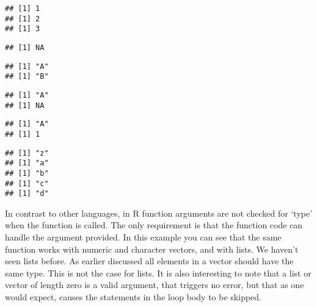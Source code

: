 \documentclass[paper=a4,headsepline,BCOR=12mm,twoside,open=right,%
titlepage,headings=small,fontsize=10pt,index=totoc,bibliography=totoc,%
captions=tableheading,captions=nooneline]{scrbook}\usepackage{knitr}
\begin{document}
\begin{knitrout}\footnotesize
{}\color{fgcolor}\begin{kframe}
\begin{alltt}
 \hlkwb{<-} \hlstd{(}\hlstd{) \{}
     
\hlstd{\}}
\hlstd{(}\hlstd{(}\hlstd{))}
\hlstd{(}\hlopt{:}\hlstd{)}
\end{alltt}
\begin{verbatim}
## [1] 1
## [1] 2
## [1] 3
\end{verbatim}
\begin{alltt}
\hlstd{(}\hlstd{)}
\end{alltt}
\begin{verbatim}
## [1] NA
\end{verbatim}
\begin{alltt}
\hlstd{(}\hlstd{(}\hlstd{,} \hlstd{))}
\end{alltt}
\begin{verbatim}
## [1] "A"
## [1] "B"
\end{verbatim}
\begin{alltt}
\hlstd{(}\hlstd{(}\hlstd{,} \hlstd{))}
\end{alltt}
\begin{verbatim}
## [1] "A"
## [1] NA
\end{verbatim}
\begin{alltt}
\hlstd{(}\hlstd{(}\hlstd{,} \hlstd{))}
\end{alltt}
\begin{verbatim}
## [1] "A"
## [1] 1
\end{verbatim}
\begin{alltt}
\hlstd{(}\hlstd{(}\hlstd{, letters[}\hlopt{:}\hlstd{]))}
\end{alltt}
\begin{verbatim}
## [1] "z"
## [1] "a"
## [1] "b"
## [1] "c"
## [1] "d"
\end{verbatim}
\end{kframe}
\end{knitrout}

In contrast to other languages, in R function arguments are not checked for `type' when the function is called. The only requirement is that the function code can handle the argument provided. In this example you can see that the same function works with numeric and character vectors, and with lists. We haven't seen lists before. As earlier discussed all elements in a vector should have the same type. This is not the case for lists. It is also interesting to note that a list or vector of length zero is a valid argument, that triggers no error, but that as one would expect, causes the statements in the loop body to be skipped.
\end{document}
